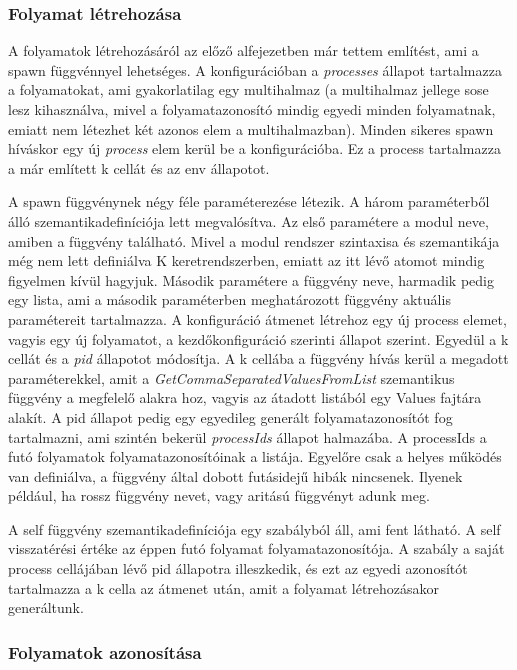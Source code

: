\subsubsection{Folyamat létrehozása}
A folyamatok létrehozásáról az előző alfejezetben már tettem említést, ami a spawn függvénnyel lehetséges. A konfigurációban a \textit{processes} állapot tartalmazza a folyamatokat, ami gyakorlatilag egy multihalmaz (a multihalmaz jellege sose lesz kihasználva, mivel a folyamatazonosító mindig egyedi minden folyamatnak, emiatt nem létezhet két azonos elem a multihalmazban). Minden sikeres spawn híváskor egy új \textit{process} elem kerül be a konfigurációba. Ez a process tartalmazza a már említett k cellát és az env állapotot.

A spawn függvénynek négy féle paraméterezése létezik. A három paraméterből álló szemantikadefiníciója lett megvalósítva. Az első paramétere a modul neve, amiben a függvény található. Mivel a modul rendszer szintaxisa és szemantikája még nem lett definiálva K keretrendszerben, emiatt az itt lévő atomot mindig figyelmen kívül hagyjuk. Második paramétere a függvény neve, harmadik pedig egy lista, ami a második paraméterben meghatározott függvény aktuális paramétereit tartalmazza. A konfiguráció átmenet létrehoz egy új process elemet, vagyis egy új folyamatot, a kezdőkonfiguráció szerinti állapot szerint. Egyedül a k cellát és a \textit{pid} állapotot módosítja. A k cellába a függvény hívás kerül a megadott paraméterekkel, amit a \textit{GetCommaSeparatedValuesFromList} szemantikus függvény a megfelelő alakra hoz, vagyis az átadott listából egy Values fajtára alakít. A pid állapot pedig egy egyedileg generált folyamatazonosítót fog tartalmazni, ami szintén bekerül \textit{processIds} állapot halmazába. A processIds a futó folyamatok folyamatazonosítóinak a listája. Egyelőre csak a helyes működés van definiálva, a függvény által dobott futásidejű hibák nincsenek. Ilyenek például, ha rossz függvény nevet, vagy aritású függvényt adunk meg.




A self függvény szemantikadefiníciója egy szabályból áll, ami fent látható. A self visszatérési értéke az éppen futó folyamat folyamatazonosítója. A szabály a saját process cellájában lévő pid állapotra illeszkedik, és ezt az egyedi azonosítót tartalmazza a k cella az átmenet után, amit a folyamat létrehozásakor generáltunk.

\subsubsection{Folyamatok azonosítása}

